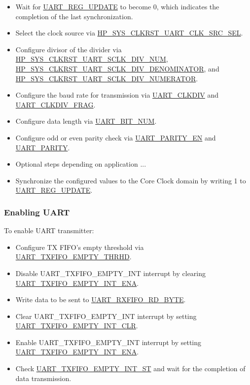 \documentclass[main\_\_EN.tex]{subfiles}
\begin{document}
\begin{itemize}
    \item Wait for \hyperref[fielddesc:UARTREGUPDATE]{UART\_REG\_UPDATE} to become 0, which indicates the completion of the last synchronization.
    \item Select the clock source via \hyperref[fielddesc:HPSYSCLKRSTUART0CLKSRCSEL]{HP\_SYS\_CLKRST\_UART\_CLK\_SRC\_SEL}.
    \item Configure divisor of the divider via \hyperref[fielddesc:HPSYSCLKRSTUART0SCLKDIVNUM]{HP\_SYS\_CLKRST\_UART\_SCLK\_DIV\_NUM}, \hyperref[fielddesc:HPSYSCLKRSTUART0SCLKDIVDENOMINATOR]{HP\_SYS\_CLKRST\_UART\_SCLK\_DIV\_DENOMINATOR}, and \hyperref[fielddesc:HPSYSCLKRSTUART0SCLKDIVNUMERATOR]{HP\_SYS\_CLKRST\_UART\_SCLK\_DIV\_NUMERATOR}.
    \item Configure the baud rate for transmission via \hyperref[fielddesc:UARTCLKDIV]{UART\_CLKDIV} and \hyperref[fielddesc:UARTCLKDIVFRAG]{UART\_CLKDIV\_FRAG}.
    \item Configure data length via \hyperref[fielddesc:UARTBITNUM]{UART\_BIT\_NUM}.
    \item Configure odd or even parity check via \hyperref[fielddesc:UARTPARITYEN]{UART\_PARITY\_EN} and \hyperref[fielddesc:UARTPARITY]{UART\_PARITY}.
    \item Optional steps depending on application ...
    \item Synchronize the configured values to the Core Clock domain by writing 1 to \hyperref[fielddesc:UARTREGUPDATE]{UART\_REG\_UPDATE}.
\end{itemize}

\subsubsection{Enabling UART}

To enable UART transmitter:

\begin{itemize}
    \item Configure TX FIFO's empty threshold via \hyperref[fielddesc:UARTTXFIFOEMPTYTHRHD]{UART\_TXFIFO\_EMPTY\_THRHD}.
    \item Disable UART\_TXFIFO\_EMPTY\_INT interrupt by clearing \hyperref[fielddesc:UARTTXFIFOEMPTYINTENA]{UART\_TXFIFO\_EMPTY\_INT\_ENA}.
    \item Write data to be sent to \hyperref[fielddesc:UARTRXFIFORDBYTE]{UART\_RXFIFO\_RD\_BYTE}.
    \item Clear UART\_TXFIFO\_EMPTY\_INT interrupt by setting  \hyperref[fielddesc:UARTTXFIFOEMPTYINTCLR]{UART\_TXFIFO\_EMPTY\_INT\_CLR}.
    \item Enable UART\_TXFIFO\_EMPTY\_INT interrupt by setting \hyperref[fielddesc:UARTTXFIFOEMPTYINTENA]{UART\_TXFIFO\_EMPTY\_INT\_ENA}.
    \item Check \hyperref[fielddesc:UARTTXFIFOEMPTYINTST]{UART\_TXFIFO\_EMPTY\_INT\_ST} and wait for the completion of data transmission.
\end{itemize}
\end{document}
